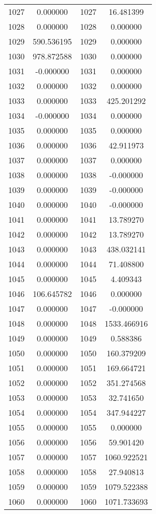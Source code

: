 \documentclass[12pt]{article}
\begin{document}
\begin{longtable}{@{}cccc@{}}
1027 & 0.000000 & 1027 & 16.481399 \\
1028 & 0.000000 & 1028 & 0.000000 \\
1029 & 590.536195 & 1029 & 0.000000 \\
1030 & 978.872588 & 1030 & 0.000000 \\
1031 & -0.000000 & 1031 & 0.000000 \\
1032 & 0.000000 & 1032 & 0.000000 \\
1033 & 0.000000 & 1033 & 425.201292 \\
1034 & -0.000000 & 1034 & 0.000000 \\
1035 & 0.000000 & 1035 & 0.000000 \\
1036 & 0.000000 & 1036 & 42.911973 \\
1037 & 0.000000 & 1037 & 0.000000 \\
1038 & 0.000000 & 1038 & -0.000000 \\
1039 & 0.000000 & 1039 & -0.000000 \\
1040 & 0.000000 & 1040 & -0.000000 \\
1041 & 0.000000 & 1041 & 13.789270 \\
1042 & 0.000000 & 1042 & 13.789270 \\
1043 & 0.000000 & 1043 & 438.032141 \\
1044 & 0.000000 & 1044 & 71.408800 \\
1045 & 0.000000 & 1045 & 4.409343 \\
1046 & 106.645782 & 1046 & 0.000000 \\
1047 & 0.000000 & 1047 & -0.000000 \\
1048 & 0.000000 & 1048 & 1533.466916 \\
1049 & 0.000000 & 1049 & 0.588386 \\
1050 & 0.000000 & 1050 & 160.379209 \\
1051 & 0.000000 & 1051 & 169.664721 \\
1052 & 0.000000 & 1052 & 351.274568 \\
1053 & 0.000000 & 1053 & 32.741650 \\
1054 & 0.000000 & 1054 & 347.944227 \\
1055 & 0.000000 & 1055 & 0.000000 \\
1056 & 0.000000 & 1056 & 59.901420 \\
1057 & 0.000000 & 1057 & 1060.922521 \\
1058 & 0.000000 & 1058 & 27.940813 \\
1059 & 0.000000 & 1059 & 1079.522388 \\
1060 & 0.000000 & 1060 & 1071.733693 \\

\end{longtable}
\end{document}
